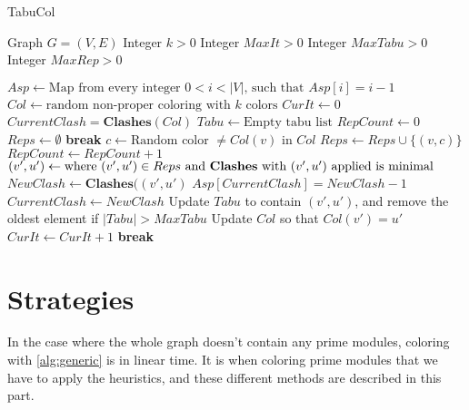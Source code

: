 \documentclass{amsart}
\newcommand{\algorithmicbreak}{\textbf{break}}
\newcommand{\BREAK}{\STATE \algorithmicbreak}
\begin{document}
\begin{algorithm}[H]
    \caption{TabuCol}
    \begin{algorithmic}[1]
        \REQUIRE Graph $G = (V,E)$
        \REQUIRE Integer $k > 0$
        \REQUIRE Integer $MaxIt > 0$
        \REQUIRE Integer $MaxTabu > 0$
        \REQUIRE Integer $MaxRep > 0$
      
        \STATE $Asp \leftarrow \text{Map from every integer $0 < i < |V|$, such that $Asp[i] = i-1$}$
        \STATE $Col \leftarrow \text{random non-proper coloring with $k$ colors}$
        \STATE $CurIt \leftarrow 0$
        \STATE $CurrentClash = \textbf{Clashes}(Col)$
        \STATE $Tabu \leftarrow \text{Empty tabu list}$
            \STATE $RepCount \leftarrow 0$
            \STATE $Reps \leftarrow \emptyset$
                    \BREAK
                \ENDIF
                \STATE $c \leftarrow \text{Random color $\neq Col(v)$ in $Col$}$
                    \STATE $Reps \leftarrow Reps \cup \{(v,c)\}$
                \ENDIF
                \STATE $RepCount \leftarrow RepCount + 1$
            \ENDFOR
            \STATE $(v',u') \leftarrow \text{where $(v',u') \in Reps$ and
            \textbf{Clashes} with $(v',u')$ applied is minimal }$
            \STATE $NewClash \leftarrow \textbf{Clashes}( (v',u')$
                \STATE $Asp[CurrentClash] = NewClash-1$
            \ENDIF
            \STATE $CurrentClash \leftarrow NewClash$
            \STATE Update $Tabu$ to contain $(v',u')$, and remove the oldest element if $|Tabu| > MaxTabu$
            \STATE Update $Col$ so that $Col(v') = u'$
            \STATE $CurIt \leftarrow CurIt + 1$
                \BREAK
            \ENDIF
        \ENDWHILE
    \end{algorithmic}
\end{algorithm}


\section{Strategies}
\label{sec:Strategies}
In the case where the whole graph doesn't contain any prime modules, coloring
with \autoref{alg:generic} is in linear time. It is when coloring prime modules
that we have to apply the heuristics, and these different methods are
described in this part.
\end{document}
